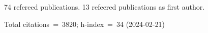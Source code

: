 74 refereed publications. 13 refeered publications as first author.

Total citations~=~3820; h-index~=~34 (2024-02-21)
